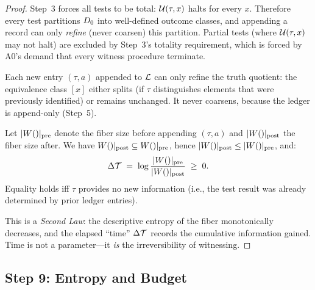 \begin{proof}
Step~3 forces all tests to be total: $\mathcal{U}(\tau, x)$ halts for every $x$.
Therefore every test partitions $D_0$ into well-defined outcome
classes, and appending a record can only \emph{refine} (never coarsen)
this partition.  Partial tests (where $\mathcal{U}(\tau, x)$ may not halt) are
excluded by Step~3's totality requirement, which is forced by A0's demand
that every witness procedure terminate.

Each new entry $(\tau, a)$ appended to $\mathcal{L}$ can only refine
the truth quotient: the equivalence class $[x]$ either splits (if $\tau$
distinguishes elements that were previously identified) or remains unchanged.
It never coarsens, because the ledger is append-only (Step~5).

Let $|W()|_{\mathrm{pre}}$ denote the fiber size before appending
$(\tau, a)$ and $|W()|_{\mathrm{post}}$ the fiber size after.
We have $W()|_{\mathrm{post}} \subseteq W()|_{\mathrm{pre}}$, hence
$|W()|_{\mathrm{post}} \leq |W()|_{\mathrm{pre}}$, and:
\[
  \Delta\mathcal{T} \;=\; \log \frac{|W()|_{\mathrm{pre}}}{|W()|_{\mathrm{post}}}
    \;\geq\; 0.
\]
Equality holds iff $\tau$ provides no new information (i.e., the test
result was already determined by prior ledger entries).

This is a \emph{Second Law}: the descriptive entropy of the fiber
monotonically decreases, and the elapsed ``time'' $\Delta\mathcal{T}$ records
the cumulative information gained.  Time is not a parameter---it \emph{is}
the irreversibility of witnessing.

\end{proof}


\subsection{Step 9: Entropy and Budget}\label{app:step9}

